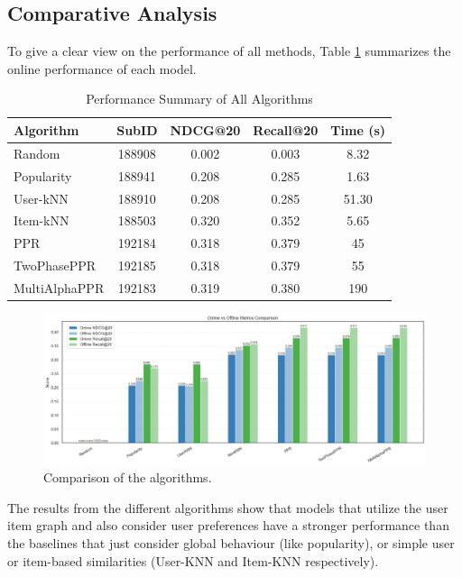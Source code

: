 \documentclass[conference,compsoc]{IEEEtran}
\begin{document}
\subsection{Comparative Analysis}
To give a clear view on the performance of all methods, Table \ref{tab:full_comparison} summarizes the online performance of each model.
\begin{table}[!ht]
    \centering
    \caption{Performance Summary of All Algorithms}
    \label{tab:full_comparison}
    \begin{tabular}{@{}lcccc@{}}
    \toprule
    \textbf{Algorithm} & \textbf{SubID} & \textbf{NDCG@20} & \textbf{Recall@20} & \textbf{Time (s)}\\
    \midrule
    Random  & 188908 & 0.002 & 0.003 & 8.32 \\
    Popularity & 188941 & 0.208 & 0.285 & 1.63 \\
    User-kNN & 188910 & 0.208 & 0.285 & 51.30 \\
    Item-kNN & 188503 & 0.320 & 0.352 & 5.65 \\
    PPR & 192184 & 0.318 & 0.379 & 45 \\
    TwoPhasePPR & 192185 & 0.318 & 0.379 & 55 \\
    MultiAlphaPPR & 192183 & 0.319 & 0.380 & 190 \\
    \bottomrule
    \end{tabular}
\end{table}

\begin{figure}[!ht]
    \centering
    \includegraphics[width=\linewidth]{images/algo_comparison.png}
    \caption{Comparison of the algorithms.}
        \label{fig:algo_comparison}
\end{figure}

The results from the different algorithms show that models that utilize the user item graph and also consider user preferences have a stronger performance than the baselines that just consider global behaviour (like popularity), or simple user or item-based similarities (User-KNN and Item-KNN respectively).
\end{document}
